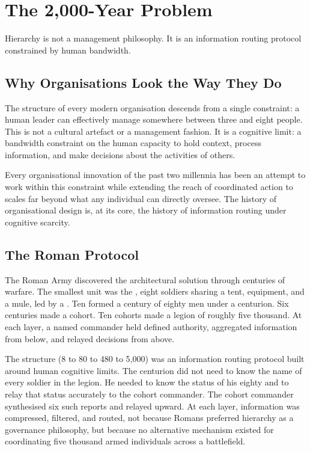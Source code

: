 \chapter{The 2,000-Year Problem}
\label{ch:historical-context}

\epigraph{Hierarchy is not a management philosophy. It is an information routing protocol constrained by human bandwidth.}{}

\section{Why Organisations Look the Way They Do}

The structure of every modern organisation descends from a single constraint: a human leader can effectively manage somewhere between three and eight people. This is not a cultural artefact or a management fashion. It is a cognitive limit: a bandwidth constraint on the human capacity to hold context, process information, and make decisions about the activities of others.

Every organisational innovation of the past two millennia has been an attempt to work within this constraint while extending the reach of coordinated action to scales far beyond what any individual can directly oversee. The history of organisational design is, at its core, the history of information routing under cognitive scarcity.

\section{The Roman Protocol}

The Roman Army discovered the architectural solution through centuries of warfare. The smallest unit was the , eight soldiers sharing a tent, equipment, and a mule, led by a . Ten  formed a century of eighty men under a centurion. Six centuries made a cohort. Ten cohorts made a legion of roughly five thousand. At each layer, a named commander held defined authority, aggregated information from below, and relayed decisions from above.

The structure (8 to 80 to 480 to 5,000) was an information routing protocol built around human cognitive limits. The centurion did not need to know the name of every soldier in the legion. He needed to know the status of his eighty and to relay that status accurately to the cohort commander. The cohort commander synthesised six such reports and relayed upward. At each layer, information was compressed, filtered, and routed, not because Romans preferred hierarchy as a governance philosophy, but because no alternative mechanism existed for coordinating five thousand armed individuals across a battlefield.

